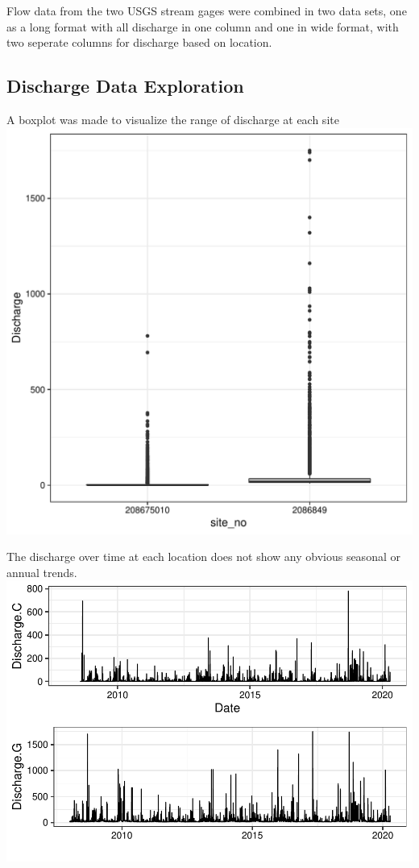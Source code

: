 \documentclass[12pt,]{article}
\begin{document}
Flow data from the two USGS stream gages were combined in two data sets,
one as a long format with all discharge in one column and one in wide
format, with two seperate columns for discharge based on location.

\hypertarget{discharge-data-exploration}{%
\subsection{Discharge Data
Exploration}\label{discharge-data-exploration}}

A boxplot was made to visualize the range of discharge at each site
\includegraphics{Landman_ENV872_Project_files/figure-latex/Exploratory Analysis Figure 2-1.pdf}

\newpage

The discharge over time at each location does not show any obvious
seasonal or annual trends.
\includegraphics{Landman_ENV872_Project_files/figure-latex/Exploratory Analysis Figure 3-1.pdf}
\end{document}
